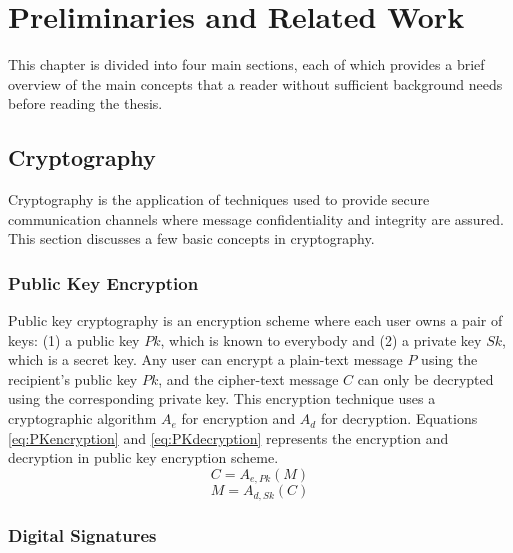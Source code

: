 
\chapter{Preliminaries and Related Work}

This chapter is divided into four main sections, each of which provides a brief overview of the main concepts that a reader without sufficient background needs before reading the thesis.

\section{Cryptography}

Cryptography is the application of techniques used to provide secure communication channels where message confidentiality and integrity are assured. This section discusses a few basic concepts in cryptography.

\subsection{Public Key Encryption}

Public key cryptography is an encryption scheme \cite{diffie1976new} where each user owns a pair of keys: (1) a public key $Pk$, which is known to everybody and (2) a private key $Sk$, which is a secret key. Any user can encrypt a plain-text message $P$ using the recipient's public key $Pk$, and the cipher-text message $C$ can only be decrypted using the corresponding private key. This encryption technique uses a cryptographic algorithm $A_e$ for encryption and $A_d$ for decryption. Equations \ref{eq:PKencryption} and \ref{eq:PKdecryption} represents the encryption and decryption in public key encryption scheme.
\begin{equation} \label{eq:PKencryption}
 C = A_{e,Pk}(M) 
\end{equation}
\begin{equation} \label{eq:PKdecryption}
 M = A_{d,Sk}(C) 
\end{equation}
 

\subsection{Digital Signatures}


